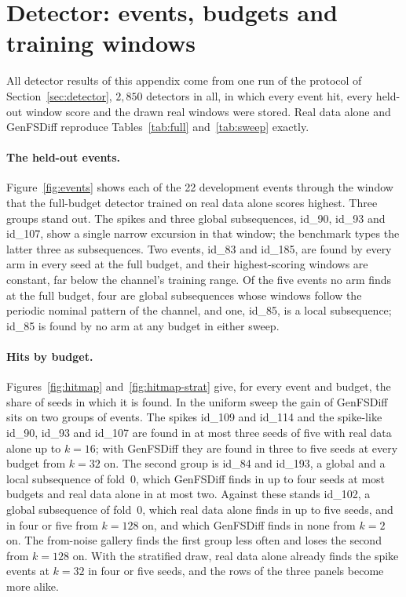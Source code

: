 \documentclass[11pt,a4paper]{article}
\begin{document}
\clearpage
\section{Detector: events, budgets and training windows}
\label{app:detect}

All detector results of this appendix come from one run of the protocol of
Section~\ref{sec:detector}, $2{,}850$ detectors in all, in which every event
hit, every held-out window score and the drawn real windows were stored.
Real data alone and GenFSDiff reproduce Tables~\ref{tab:full}
and~\ref{tab:sweep} exactly.

\paragraph{The held-out events.}
Figure~\ref{fig:events} shows each of the 22 development events through the
window that the full-budget detector trained on real data alone scores
highest. Three groups stand out. The spikes and three global subsequences,
id\_90, id\_93 and id\_107, show a single narrow excursion in that window; the
benchmark types the latter three as subsequences. Two events, id\_83 and
id\_185, are found by every arm in every seed at the full budget, and their
highest-scoring windows are constant, far below the channel's training
range. Of the five events no arm finds at the full budget,
four are global subsequences whose windows follow the periodic nominal
pattern of the channel, and one, id\_85, is a local subsequence; id\_85 is
found by no arm at any budget in either sweep.

\paragraph{Hits by budget.}
Figures~\ref{fig:hitmap} and~\ref{fig:hitmap-strat} give, for every event and
budget, the share of seeds in which it is found. In the uniform sweep the gain
of GenFSDiff sits on two groups of events. The spikes id\_109 and id\_114 and
the spike-like id\_90, id\_93 and id\_107 are found in at most three seeds of
five with real data alone up to $k = 16$; with GenFSDiff they are found in
three to five seeds at every budget from $k = 32$ on. The second group is
id\_84 and id\_193, a global and a local subsequence of fold~0, which
GenFSDiff finds in up to four seeds at most budgets and real data alone in at
most two. Against these stands id\_102, a global subsequence of fold~0, which
real data alone finds in up to five seeds, and in four or five from
$k = 128$ on, and which GenFSDiff finds in none from $k = 2$ on. The from-noise gallery finds
the first group less often and loses the second from $k = 128$ on. With the
stratified draw, real data alone already finds the spike events at
$k = 32$ in four or five seeds, and the rows of the three panels become more
alike.
\end{document}
